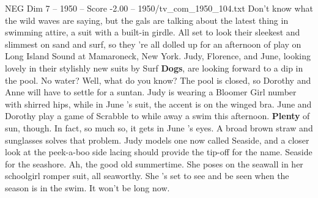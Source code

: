 \begin{textsample}{NEG Dim 7 – 1950 – Score -2.00 – 1950/tv\_com\_1950\_104.txt}  \label{ex:f7_neg_080}
Don't know what the wild waves are saying, but the gals are talking about the latest thing in swimming attire, a suit with a built-in girdle.
All set to look their sleekest and slimmest on sand and surf, so they 're all dolled up for an afternoon of play on Long Island Sound at Mamaroneck, New York.
Judy, Florence, and June, looking lovely in their stylishly new suits by Surf \textbf{Dogs}, are looking forward to a dip in the pool.
No water?
Well, what do you know?
The pool is closed, so Dorothy and Anne will have to settle for a suntan.
Judy is wearing a Bloomer Girl number with shirred hips, while in June 's suit, the accent is on the winged bra.
June and Dorothy play a game of Scrabble to while away a swim this afternoon. \textbf{Plenty} of sun, though.
In fact, so much so, it gets in June 's eyes.
A broad brown straw and sunglasses solves that problem.
Judy models one now called Seaside, and a closer look at the peek-a-boo side lacing should provide the tip-off for the name.
Seaside for the seashore.
Ah, the good old summertime.
She poses on the seawall in her schoolgirl romper suit, all seaworthy.
She 's set to see and be seen when the season is in the swim.
It won't be long now.

\end{textsample}
